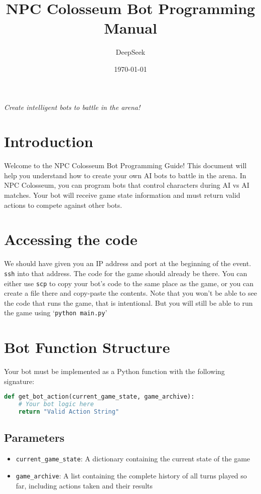 \documentclass[12pt]{article}
\title{\Huge\textbf{NPC Colosseum Bot Programming Manual}}
\author{DeepSeek}
\date{\today}
\begin{document}
\maketitle

\begin{center}
\textit{Create intelligent bots to battle in the arena!}
\end{center}

\vspace{2em}

\tableofcontents
\newpage

\section{Introduction}
\label{sec:introduction}

Welcome to the NPC Colosseum Bot Programming Guide! This document will help you understand how to create your own AI bots to battle in the arena. In NPC Colosseum, you can program bots that control characters during AI vs AI matches. Your bot will receive game state information and must return valid actions to compete against other bots.

\section{Accessing the code}
We should have given you an IP address and port at the beginning of the event. \texttt{ssh} into that address. The code for the game should already be there.
You can either use \texttt{scp} to copy your bot's code to the same place as the game, or you can create a file there and copy-paste the contents.
Note that you won't be able to see the code that runs the game, that is intentional. But you will still be able to run the game using
`\texttt{python main.py}'
\section{Bot Function Structure}
\label{sec:bot-structure}

Your bot must be implemented as a Python function with the following signature:

\begin{lstlisting}[language=Python, caption=Bot Function Signature]
def get_bot_action(current_game_state, game_archive):
    # Your bot logic here
    return "Valid Action String"
\end{lstlisting}

\subsection{Parameters}
\begin{itemize}
    \item \texttt{current\_game\_state}: A dictionary containing the current state of the game
    \item \texttt{game\_archive}: A list containing the complete history of all turns played so far, including actions taken and their results
\end{itemize}
\end{document}
